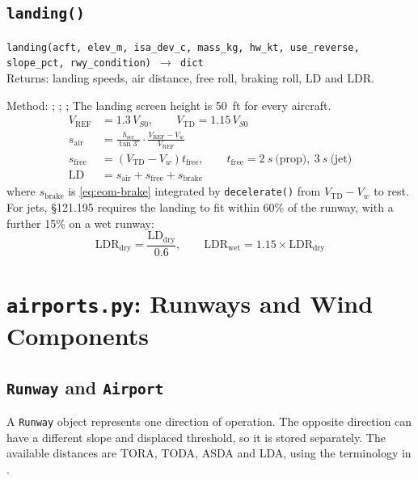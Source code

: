 \documentclass[11pt,letterpaper]{article}
\numberwithin{equation}{section}
\newcommand{\func}[2]{\begin{funcbox}\texttt{#1}\\[2pt]{\color{ink3}Returns:} #2\end{funcbox}}
\newcommand{\code}[1]{\textmd{\texttt{#1}}}
\begin{document}
\subsection{\code{landing()}}
\func{landing(acft, elev\_m, isa\_dev\_c, mass\_kg, hw\_kt, use\_reverse, slope\_pct, rwy\_condition) $\rightarrow$ dict}{landing speeds, air distance, free roll, braking roll, LD and LDR.}
Method: \cite[Ch.~6]{ANDERSON-APD}; \cite[Ch.~17]{RAYMER}; \cite[\S25.125]{14CFR25}; \cite[\S121.195.]{14CFR121} The landing screen height is \SI{50}{ft} for every aircraft.
\begin{align}
V_\text{REF} &= 1.3\,V_{S0}, \qquad V_\text{TD} = 1.15\,V_{S0} \label{eq:vref}\\
s_\text{air} &= \frac{h_\text{scr}}{\tan 3^\circ}\cdot\frac{V_\text{REF} - V_w}{V_\text{REF}} \label{eq:ld-air}\\
s_\text{free} &= \left(V_\text{TD} - V_w\right) t_\text{free}, \qquad t_\text{free} = \SI{2}{s}\ \text{(prop)},\ \SI{3}{s}\ \text{(jet)} \label{eq:ld-free}\\
\text{LD} &= s_\text{air} + s_\text{free} + s_\text{brake} \label{eq:ld}
\end{align}
where $s_\text{brake}$ is \eqref{eq:eom-brake} integrated by \code{decelerate()} from $V_\text{TD} - V_w$ to rest. For jets, \S121.195 requires the landing to fit within 60\% of the runway, with a further 15\% on a wet runway:
\begin{equation}
\text{LDR}_\text{dry} = \frac{\text{LD}_\text{dry}}{0.6}, \qquad \text{LDR}_\text{wet} = 1.15\times\text{LDR}_\text{dry} \label{eq:ldr}
\end{equation}

\section{\code{airports.py}: Runways and Wind Components}\label{sec:airports}
\subsection{\code{Runway} and \code{Airport}}
A \code{Runway} object represents one direction of operation. The opposite direction can have a different slope and displaced threshold, so it is stored separately. The available distances are TORA, TODA, ASDA and LDA, using the terminology in \cite{ICAO-A14}.
\end{document}
